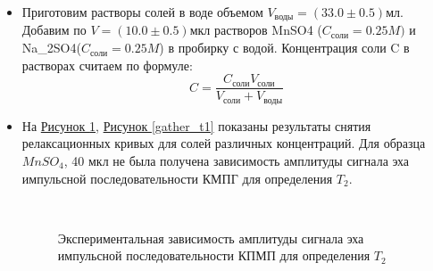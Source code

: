\documentclass{article}
\begin{document}
\begin{itemize}


\item Приготовим растворы солей в воде объемом $V_{\text{воды}}=(33.0 \pm0.5)$мл. Добавим  по $V=(10.0\pm 0.5)$мкл растворов MnSO4 ($C_{соли}=0.25M)$ и Na\_2SO4($C_{соли} = 0.25M$) в пробирку с водой. Концентрация соли C в растворах считаем по формуле:
\begin{equation*}
    C = \frac{C_{\text{соли}}V_{\text{соли}}}{V_{\text{соли}}+V_{\text{воды}}}
\end{equation*}

\item На \hyperref[gather_t2]{Рисунок \ref*{gather_t2}}, \hyperref[gather_t1]{Рисунок \ref*{gather_t1}} показаны результаты снятия релаксационных кривых для солей различных концентраций. Для образца $MnSO_4$, 40 мкл не была получена зависимость амплитуды сигнала эха импульсной
последовательности КМПГ для
определения $T_2$.


\begin{figure}[h!]
\begin{minipage}[h]{0.49\linewidth}
 \caption{Экспериментальная зависимость амплитуды сигнала эха импульсной последовательности КПМП для определения $T_2$} \label{gather_t2} \\


\end{minipage}
\end{figure}
\end{itemize}
\end{document}
